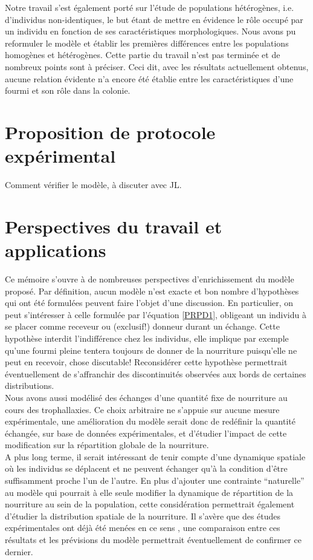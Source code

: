 Notre travail s'est également porté sur l'étude de populations hétérogènes, i.e. d'individus non-identiques, le but étant de mettre en évidence le rôle occupé par un individu en fonction de ses caractéristiques morphologiques. Nous avons pu reformuler le modèle et établir les premières différences entre les populations homogènes et hétérogènes. Cette partie du travail n'est pas terminée et de nombreux points sont à préciser. Ceci dit, avec les résultats actuellement obtenus, aucune relation évidente n'a encore été établie entre les caractéristiques d'une fourmi et son rôle dans la colonie.\\



\section{Proposition de protocole expérimental}
Comment vérifier le modèle, à discuter avec JL.

\section{Perspectives du travail et applications}

Ce mémoire s'ouvre à de nombreuses perspectives d'enrichissement du modèle proposé. Par définition, aucun modèle n'est exacte et bon nombre d'hypothèses qui ont été formulées peuvent faire l'objet d'une discussion. En particulier, on peut s'intéresser à celle formulée par l'équation \ref{PRPD1}, obligeant un individu à se placer comme receveur ou (exclusif!) donneur durant un échange. Cette hypothèse interdit l'indifférence chez les individus, elle implique par exemple qu'une fourmi pleine tentera toujours de donner de la nourriture puisqu'elle ne peut en recevoir, chose discutable! Reconsidérer cette hypothèse permettrait éventuellement de s'affranchir des discontinuités observées aux bords de certaines distributions.\\
Nous avons aussi modélisé des échanges d'une quantité fixe de nourriture au cours des trophallaxies. Ce choix arbitraire ne s'appuie sur aucune mesure expérimentale, une amélioration du modèle serait donc de redéfinir la quantité échangée, sur base de données expérimentales, et d'étudier l'impact de cette modification sur la répartition globale de la nourriture.\\

A plus long terme, il serait intéressant de tenir compte d'une dynamique spatiale où les individus se déplacent et ne peuvent échanger qu'à la condition d'être suffisamment proche l'un de l'autre. En plus d'ajouter une contrainte ``naturelle'' au modèle qui pourrait à elle seule modifier la dynamique de répartition de la nourriture au sein de la population, cette considération permettrait également d'étudier la distribution spatiale de la nourriture. Il s'avère que des études expérimentales ont déjà été menées en ce sens \citep{buffin_feeding_2009}, une comparaison entre ces résultats et les prévisions du modèle permettrait éventuellement de confirmer ce dernier.\\

